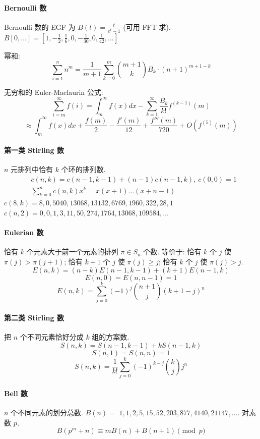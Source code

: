 	\paragraph{Bernoulli 数}
		Bernoulli 数的 EGF 为 $B(t)=\frac{t}{e^t-1}$ (可用 FFT 求).
		$B[0,\ldots] = [1, -\frac{1}{2}, \frac{1}{6}, 0, -\frac{1}{30}, 0, \frac{1}{42}, \ldots]$

		幂和:
		\small
		\[ \sum_{i=1}^n n^m = \frac{1}{m+1} \sum_{k=0}^m \binom{m+1}{k} B_k \cdot (n+1)^{m+1-k} \]
		\normalsize

		无穷和的 Euler-Maclaurin 公式:
		\small
		\[ \sum_{i=m}^{\infty} f(i) = \int_m^\infty f(x) dx - \sum_{k=1}^\infty \frac{B_k}{k!}f^{(k-1)}(m) \]
		\[ \approx \int_{m}^\infty f(x)dx + \frac{f(m)}{2} - \frac{f'(m)}{12} + \frac{f'''(m)}{720} + O(f^{(5)}(m)) \]
		\normalsize

	\paragraph{第一类 Stirling 数}
		$n$ 元排列中恰有 $k$ 个环的排列数.
		\begin{align*}
			&c(n,k) = c(n-1,k-1) + (n-1) c(n-1,k),\ c(0,0) = 1 \\
			&\textstyle \sum_{k=0}^n c(n,k)x^k = x(x+1) \dots (x+n-1)
		\end{align*}
		$c(8,k) = 8, 0, 5040, 13068, 13132, 6769, 1960, 322, 28, 1$ \\
		$c(n,2) = 0, 0, 1, 3, 11, 50, 274, 1764, 13068, 109584, \dots$

	\paragraph{Eulerian 数}
		恰有 $k$ 个元素大于前一个元素的排列 $\pi \in S_n$ 个数. 等价于: 恰有 $k$ 个 $j$ 使 $\pi(j)>\pi(j+1)$; 恰有 $k+1$ 个 $j$ 使 $\pi(j)\geq j$; 恰有 $k$ 个 $j$ 使 $\pi(j)>j$.
		$$E(n,k) = (n-k)E(n-1,k-1) + (k+1)E(n-1,k)$$
		$$E(n,0) = E(n,n-1) = 1$$
		$$E(n,k) = \sum_{j=0}^k(-1)^j\binom{n+1}{j}(k+1-j)^n$$

	\paragraph{第二类 Stirling 数}
		把 $n$ 个不同元素恰好分成 $k$ 组的方案数.
		$$S(n,k) = S(n-1,k-1) + k S(n-1,k)$$
		$$S(n,1) = S(n,n) = 1$$
		$$S(n,k) = \frac{1}{k!}\sum_{j=0}^k (-1)^{k-j}\binom{k}{j}j^n$$

	\paragraph{Bell 数}
		$n$ 个不同元素的划分总数. $B(n) =$
		$1, 1, 2, 5, 15, 52, 203, 877, 4140, 21147, \dots$. 对素数 $p$,
		\[ B(p^m+n)\equiv mB(n)+B(n+1) \pmod{p} \]

